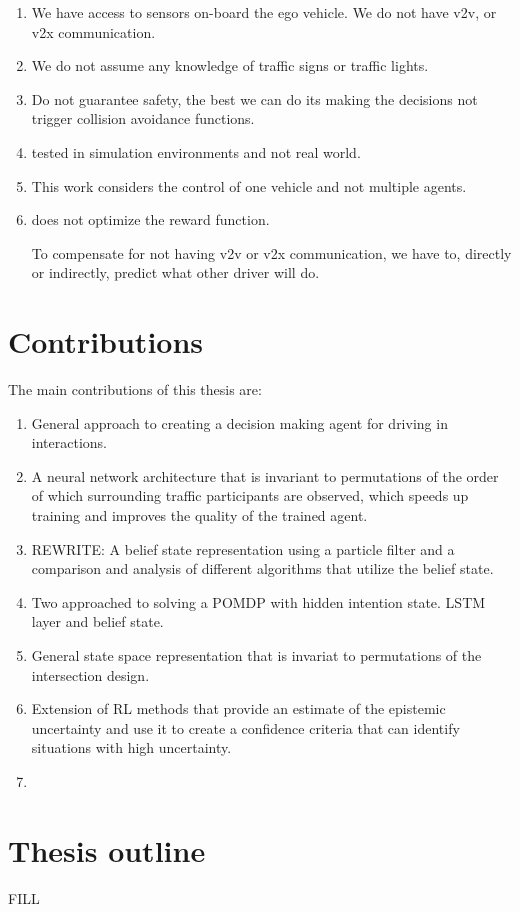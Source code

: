 \begin{enumerate}
	\item We have access to sensors on-board the ego vehicle. We do not have v2v, or v2x communication. 
	\item We do not assume any knowledge of traffic signs or traffic lights. 
	\item Do not guarantee safety, the best we can do its making the decisions not trigger collision avoidance functions. 
	\item tested in simulation environments and not real world. 
	\item This work considers the control of one vehicle and not multiple agents. 
	\item does not optimize the reward function. 
	
	To compensate for not having v2v or v2x communication, we have to, directly or indirectly, predict what other driver will do. 
	
\end{enumerate}


\section{Contributions}
The main contributions of this thesis are:
\begin{enumerate}
	\item General approach to creating a decision making agent for driving in interactions. 
	\item A neural network architecture that is invariant to permutations of the order of which surrounding traffic participants are observed, which speeds up training and improves the quality of the trained agent. 
	\item REWRITE: A belief state representation using a particle filter and a comparison and analysis of different algorithms that utilize the belief state. 
	\item Two approached to solving a POMDP with hidden intention state. LSTM layer and belief state. 
	\item General state space representation that is invariat to permutations of the intersection design. 
	\item Extension of RL methods that provide an estimate of the epistemic uncertainty and use it to create a confidence criteria that can identify situations with high uncertainty. 
	\item {}

\end{enumerate}


\section{Thesis outline}
FILL


